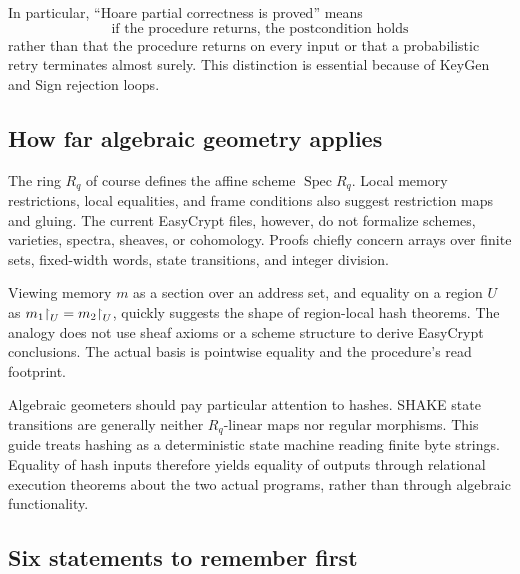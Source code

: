 In particular, “Hoare partial correctness is proved” means
\[
  \text{if the procedure returns, the postcondition holds}
\]
rather than that the procedure returns on every input or that a probabilistic
retry terminates almost surely. This distinction is essential because of
KeyGen and Sign rejection loops.

\subsection{How far algebraic geometry applies}

The ring \(R_q\) of course defines the affine scheme
\(\operatorname{Spec}R_q\). Local memory restrictions, local equalities,
and frame conditions also suggest restriction maps and gluing.
The current EasyCrypt files, however, do not formalize schemes, varieties,
spectra, sheaves, or cohomology. Proofs chiefly concern arrays over finite sets,
fixed-width words, state transitions, and integer division.

\begin{analogy}
Viewing memory \(m\) as a section over an address set, and equality on a region
\(U\) as \(m_1\mathord{\upharpoonright}_U=m_2\mathord{\upharpoonright}_U\), quickly suggests the shape of
region-local hash theorems. The analogy does not use sheaf axioms or a scheme
structure to derive EasyCrypt conclusions. The actual basis is pointwise
 equality and the procedure's read footprint.
\end{analogy}

Algebraic geometers should pay particular attention to hashes.
SHAKE state transitions are generally neither \(R_q\)-linear maps nor regular
morphisms. This guide treats hashing as a deterministic state machine reading
finite byte strings. Equality of hash inputs therefore yields equality of
outputs through relational execution theorems about the two actual programs,
rather than through algebraic functionality.

\subsection{Six statements to remember first}


